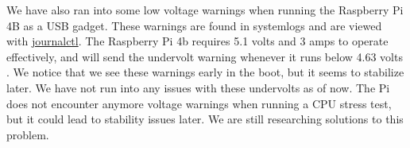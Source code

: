 We have also ran into some low voltage warnings when running the Raspberry Pi 4B as a USB
gadget. These warnings are found in systemlogs and are viewed with \url{journalctl}. The
Raspberry Pi 4b requires 5.1 volts and 3 amps to operate effectively, and will send the
undervolt warning whenever it runs below 4.63 volts
\autocite{raspberryPiAmps}. We notice that we see these warnings early in the boot, but it
seems to stabilize later. We have not run into any issues with these undervolts as of now.
The Pi does not encounter anymore voltage warnings when running a CPU stress test, but it
could lead to stability issues later.  We are still researching  solutions to this
problem.
